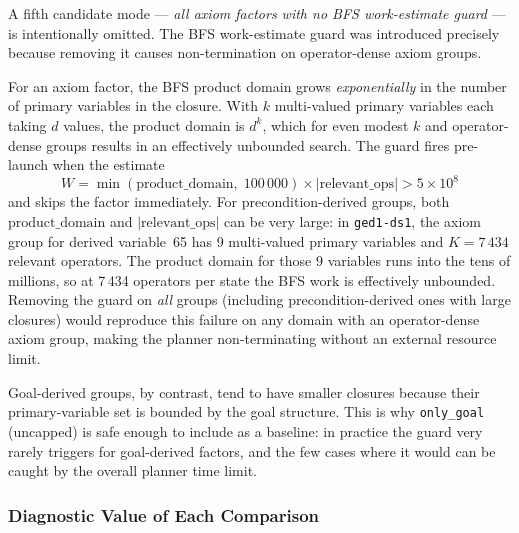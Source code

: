 \documentclass[11pt,a4paper]{article}
\begin{document}
A fifth candidate mode --- \emph{all axiom factors with no BFS work-estimate
guard} --- is intentionally omitted.  The BFS work-estimate guard was
introduced precisely because removing it causes non-termination on
operator-dense axiom groups.

For an axiom factor, the BFS product domain grows \emph{exponentially} in
the number of primary variables in the closure.  With $k$ multi-valued primary
variables each taking $d$ values, the product domain is $d^k$, which for
even modest $k$ and operator-dense groups results in an effectively unbounded
search.  The guard fires pre-launch when the estimate
\[
  W = \min(\text{product\_domain},\;100\,000)
      \times \lvert\text{relevant\_ops}\rvert
      > 5\times 10^8
\]
and skips the factor immediately.  For precondition-derived groups, both
$\text{product\_domain}$ and $\lvert\text{relevant\_ops}\rvert$ can be very
large: in \texttt{ged1-ds1}, the axiom group for derived variable~65 has
9 multi-valued primary variables and $K = 7\,434$ relevant operators.
The product domain for those 9 variables runs into the tens of millions, so
at 7\,434 operators per state the BFS work is effectively unbounded.
Removing the guard on \emph{all} groups (including precondition-derived ones
with large closures) would reproduce this failure on any domain with an
operator-dense axiom group, making the planner non-terminating without an
external resource limit.

Goal-derived groups, by contrast, tend to have smaller closures because their
primary-variable set is bounded by the goal structure.  This is why
\texttt{only\_goal} (uncapped) is safe enough to include as a baseline:
in practice the guard very rarely triggers for goal-derived factors, and the
few cases where it would can be caught by the overall planner time limit.

\subsubsection{Diagnostic Value of Each Comparison}
\label{sec:diagnostic-value}
\end{document}
